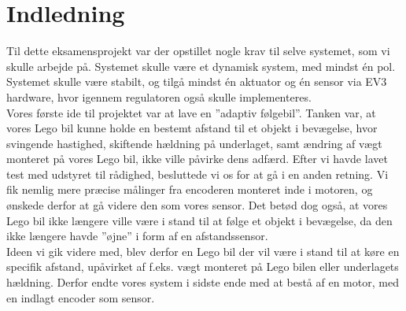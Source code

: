 \graphicspath{{Chapters/Indledning/}}

\section{Indledning}
Til dette eksamensprojekt var der opstillet nogle krav til selve systemet, som vi skulle arbejde på. Systemet skulle være et dynamisk system, med mindst én pol. Systemet skulle være stabilt, og tilgå mindst én aktuator og én sensor via EV3 hardware, hvor igennem regulatoren også skulle implementeres.\\
Vores første ide til projektet var at lave en ”adaptiv følgebil”. Tanken var, at vores Lego bil kunne holde en bestemt afstand til et objekt i bevægelse, hvor svingende hastighed, skiftende hældning på underlaget, samt ændring af vægt monteret på vores Lego bil, ikke ville påvirke dens adfærd.
Efter vi havde lavet test med udstyret til rådighed, besluttede vi os for at gå i en anden retning. Vi fik nemlig mere præcise målinger fra encoderen monteret inde i motoren, og ønskede derfor at gå videre den som vores sensor. Det betød dog også, at vores Lego bil ikke længere ville være i stand til at følge et objekt i bevægelse, da den ikke længere havde ”øjne” i form af en afstandssensor. \\
Ideen vi gik videre med, blev derfor en Lego bil der vil være i stand til at køre en specifik afstand, upåvirket af f.eks. vægt monteret på Lego bilen eller underlagets hældning. Derfor endte vores system i sidste ende med at bestå af en motor, med en indlagt encoder som sensor. 

	
\newpage

